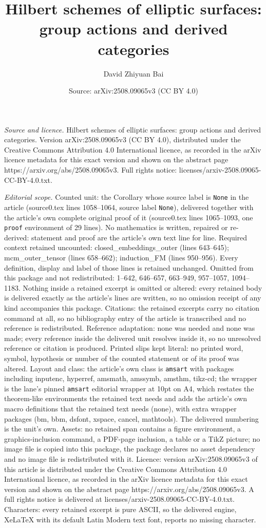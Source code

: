 \documentclass[10pt,a4paper]{amsart}
\title[Hilbert schemes of elliptic surfaces: group actions and deri]{Hilbert schemes of elliptic surfaces: group actions and derived categories}
\author{David Zhiyuan Bai}
\date{Source: arXiv:2508.09065v3 (CC BY 4.0)}
\begin{document}
\maketitle

\noindent\emph{Source and licence.} Hilbert schemes of elliptic surfaces: group actions and derived categories. Version arXiv:2508.09065v3 (CC BY 4.0), distributed under the Creative Commons Attribution 4.0 International licence, as recorded in the arXiv licence metadata for this exact version and shown on the abstract page https://arxiv.org/abs/2508.09065v3. Full rights notice: licenses/arxiv-2508.09065-CC-BY-4.0.txt.\par\smallskip

\noindent\textit{Editorial scope.} Counted unit: the Corollary whose source label is \texttt{None} in the article (source0.tex lines 1058--1064, source label \texttt{None}), delivered together with the article's own complete original proof of it (source0.tex lines 1065--1093, one \texttt{proof} environment of 29 lines). No mathematics is written, repaired or re-derived: statement and proof are the article's own text line for line. Required context retained uncounted: closed\_embeddings\_outer (lines 643--645); mcm\_outer\_tensor (lines 658--662); induction\_FM (lines 950--956). Every definition, display and label of those lines is retained unchanged. Omitted from this package and not redistributed: 1--642, 646--657, 663--949, 957--1057, 1094--1183. Nothing inside a retained excerpt is omitted or altered: every retained body is delivered exactly as the article's lines are written, so no omission receipt of any kind accompanies this package. Citations: the retained excerpts carry no citation command at all, so no bibliography entry of the article is transcribed and no reference is redistributed. Reference adaptation: none was needed and none was made; every reference inside the delivered unit resolves inside it, so no unresolved reference or citation is produced. Printed slips kept literal: no printed word, symbol, hypothesis or number of the counted statement or of its proof was altered. Layout and class: the article's own class is \texttt{amsart} with packages including inputenc, hyperref, amsmath, amssymb, amsthm, tikz-cd; the wrapper is the lane's pinned \texttt{amsart} editorial wrapper at 10pt on A4, which restates the theorem-like environments the retained text needs and adds the article's own macro definitions that the retained text needs (none), with extra wrapper packages (bm, bbm, dsfont, xspace, cancel, mathtools). The delivered numbering is the unit's own. Assets: no retained span contains a figure environment, a graphics-inclusion command, a PDF-page inclusion, a table or a TikZ picture; no image file is copied into this package, the package declares no asset dependency and no image file is redistributed with it. Licence: version arXiv:2508.09065v3 of this article is distributed under the Creative Commons Attribution 4.0 International licence, as recorded in the arXiv licence metadata for this exact version and shown on the abstract page https://arxiv.org/abs/2508.09065v3. A full rights notice is delivered at licenses/arxiv-2508.09065-CC-BY-4.0.txt. Characters: every retained excerpt is pure ASCII, so the delivered engine, XeLaTeX with its default Latin Modern text font, reports no missing character.
\end{document}
